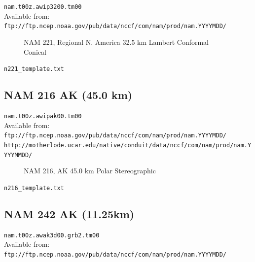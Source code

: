 \documentclass[11pt]{article}   %
\begin{document}
\verb|nam.t00z.awip3200.tm00|\\
Available from:\\
\verb|ftp://ftp.ncep.noaa.gov/pub/data/nccf/com/nam/prod/nam.YYYYMDD/| \\

\begin{figure}[htbp]\begin{center}
\parbox{15cm}{\caption{\label{FigNAM221}
NAM 221, Regional N. America 32.5 km Lambert Conformal Conical
}}
\end{center}\end{figure}
\clearpage
\verb|n221_template.txt| \\
\tiny  \normalsize


\clearpage
\subsection{NAM 216 AK (45.0 km)}

\verb|nam.t00z.awipak00.tm00|\\
Available from:\\
\verb|ftp://ftp.ncep.noaa.gov/pub/data/nccf/com/nam/prod/nam.YYYYMDD/| \\
\verb|http://motherlode.ucar.edu/native/conduit/data/nccf/com/nam/prod/nam.YYYYMMDD/|\\

\begin{figure}[htbp]\begin{center}
\parbox{15cm}{\caption{\label{FigNAM2116}
NAM 216, AK 45.0 km Polar Stereographic
}}
\end{center}\end{figure}
\clearpage 
\verb|n216_template.txt| \\
\tiny  \normalsize


\clearpage
\subsection{NAM 242 AK (11.25km)}

\verb|nam.t00z.awak3d00.grb2.tm00|\\
Available from:\\
\verb|ftp://ftp.ncep.noaa.gov/pub/data/nccf/com/nam/prod/nam.YYYYMDD/|
\end{document}
